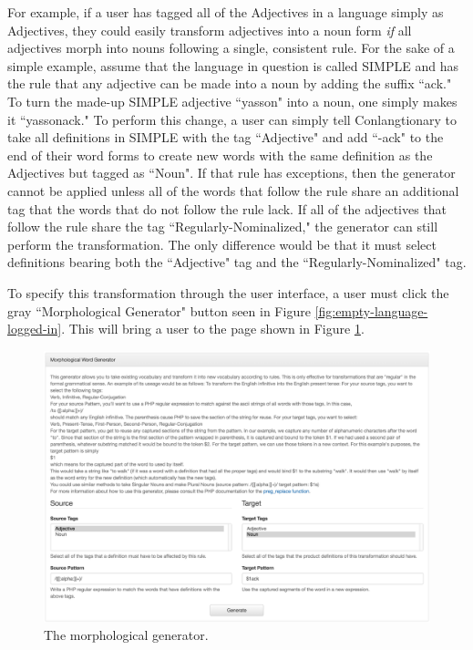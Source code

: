 For example, if a user has tagged all of the Adjectives in a language simply as Adjectives, they could easily transform adjectives into a noun form \textit{if} all adjectives morph into nouns following a single, consistent rule. For the sake of a simple example, assume that the language in question is called SIMPLE and has the rule that any adjective can be made into a noun by adding the suffix ``ack." To turn the made-up SIMPLE adjective ``yasson" into a noun, one simply makes it ``yassonack." To perform this change, a user can simply tell Conlangtionary to take all definitions in SIMPLE with the tag ``Adjective" and add ``-ack" to the end of their word forms to create new words with the same definition as the Adjectives but tagged as ``Noun". If that rule has exceptions, then the generator cannot be applied unless all of the words that follow the rule share an additional tag that the words that do not follow the rule lack. If all of the adjectives that follow the rule share the tag ``Regularly-Nominalized," the generator can still perform the transformation. The only difference would be that it must select definitions bearing both the ``Adjective" tag and the ``Regularly-Nominalized" tag.

To specify this transformation through the user interface, a user must click the gray ``Morphological Generator" button seen in Figure \ref{fig:empty-language-logged-in}. This will bring a user to the page shown in Figure \ref{fig:morphological-generator}.

\begin{figure}[h]
\includegraphics[width=\textwidth]{figures/morphological-generator-filled-in}
\caption{The morphological generator.}
\centering
\label{fig:morphological-generator}
\end{figure}

